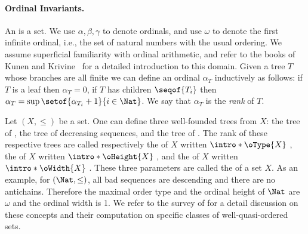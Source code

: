 \paragraph*{Ordinal Invariants.} \label{ordinal-invariants:subsec}
An  is a  
set. We use $\alpha, \beta, \gamma$ to denote ordinals, and use $\omega$ to
denote the first infinite ordinal, i.e., the set of natural numbers with the
usual ordering. We assume superficial familiarity with ordinal arithmetic, and
refer to the books of Kunen \cite{KUNEN80} and Krivine~\cite[Chapter
II]{KRIVINE71} for a detailed introduction to this domain. Given a tree $T$
whose branches are all finite we can define an ordinal $\alpha_T$ inductively
as follows: if $T$ is a leaf then $\alpha_T = 0$, if $T$ has children
$\seqof{T_i}$ then $\alpha_T = \sup \setof{\alpha_{T_i} + 1}{i \in \Nat}$. We
say that $\alpha_T$ is the \emph{rank} of $T$. 

Let $(X, \leq)$ be a  set. One can define three
well-founded trees from $X$: the tree of , the tree of
decreasing sequences, and the tree of . The rank of these
respective trees are called respectively the  of $X$
written $\intro*{\oType{X}}$ \cite{dejongh77}, the  of
$X$ written $\intro*{\oHeight{X}}$ \cite{schmidt81}, and the  of $X$ written $\intro*{\oWidth{X}}$ \cite{kriz90b}. These three
parameters are called the  of a
 set $X$. 
As an example, for $(\Nat, \leq)$, all bad sequences are descending and there are no antichains. Therefore the maximal order type and the ordinal height of $\Nat$ are $\omega$ and the ordinal width is 1. 
We refer to the survey of \cite{DZSCSC20} for
a detail discussion on these concepts and their computation on specific classes
of well-quasi-ordered sets.


